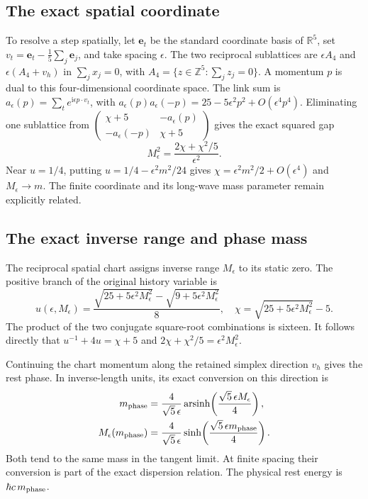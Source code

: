 \documentclass[aps,prx,onecolumn,10pt,notitlepage,nofootinbib,longbibliography]{revtex4-2}
\numberwithin{equation}{section}
\numberwithin{table}{section}
\newcommand{\RR}{\mathbb R}
\newcommand{\ii}{\mathrm i}
\begin{document}
\subsection{The exact spatial coordinate}
\label{sec:spectralcoordinate}
To resolve a step spatially, let $\mathbf e_t$ be the standard coordinate basis of $\RR^5$, set $v_t=\mathbf e_t-\frac15\sum_j\mathbf e_j$, and take spacing $\epsilon$. The two reciprocal sublattices are $\epsilon A_4$ and $\epsilon(A_4+v_h)$ in $\sum_jx_j=0$, with $A_4=\{z\in\mathbb Z^5:\sum_jz_j=0\}$. A momentum $p$ is dual to this four-dimensional coordinate space. The link sum is $a_\epsilon(p)=\sum_te^{\ii\epsilon p\cdot v_t}$, with $a_\epsilon(p)a_\epsilon(-p)=25-5\epsilon^2p^2+O(\epsilon^4p^4)$. Eliminating one sublattice from $\left(\begin{smallmatrix}\chi+5&-a_\epsilon(p)\\-a_\epsilon(-p)&\chi+5\end{smallmatrix}\right)$ gives the exact squared gap
\begin{equation}
 M_\epsilon^2=\frac{2\chi+\chi^2/5}{\epsilon^2}.
 \label{eq:exactgap}
\end{equation}
Near $u=1/4$, putting $u=1/4-\epsilon^2m^2/24$ gives $\chi=\epsilon^2m^2/2+O(\epsilon^4)$ and $M_\epsilon\to m$. The finite coordinate and its long-wave mass parameter remain explicitly related.

\subsection{The exact inverse range and phase mass}

The reciprocal spatial chart assigns inverse range $M_\epsilon$ to its
static zero. The positive branch of the original history variable is
\begin{equation}
 u(\epsilon,M_\epsilon)
 =\frac{\sqrt{25+5\epsilon^2M_\epsilon^2}
        -\sqrt{9+5\epsilon^2M_\epsilon^2}}8,
 \quad
 \chi=\sqrt{25+5\epsilon^2M_\epsilon^2}-5.
 \label{eq:exactradialbranch}
\end{equation}
The product of the two conjugate square-root combinations is sixteen.
It follows directly that $u^{-1}+4u=\chi+5$ and
$2\chi+\chi^2/5=\epsilon^2M_\epsilon^2$.

Continuing the chart momentum along the retained simplex direction $v_h$ gives the rest phase. In inverse-length units, its exact conversion on this direction is
\begin{align}
 m_{\rm phase}
 &=\frac4{\sqrt5\,\epsilon}
 \operatorname{arsinh}\!\left(\frac{\sqrt5\,\epsilon M_\epsilon}{4}\right),
 \notag\\
 M_\epsilon(m_{\rm phase})
 &=\frac4{\sqrt5\,\epsilon}
 \sinh\!\left(\frac{\sqrt5\,\epsilon m_{\rm phase}}4\right).
 \label{eq:finite_mass_conversion}
\end{align}
Both tend to the same mass in the tangent limit. At finite spacing their
conversion is part of the exact dispersion relation. The physical rest
energy is $\hbar c\,m_{\rm phase}$.
\end{document}
